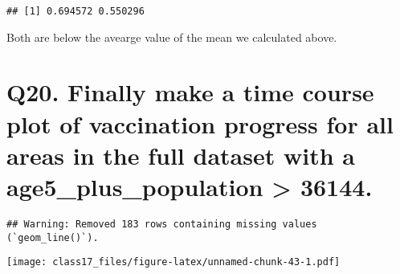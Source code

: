 \documentclass[
]{article}
\newenvironment{Shaded}{\begin{snugshade}}{\end{snugshade}}
\newcommand{\AttributeTok}[1]{\textcolor[rgb]{0.77,0.63,0.00}{#1}}
\newcommand{\DecValTok}[1]{\textcolor[rgb]{0.00,0.00,0.81}{#1}}
\newcommand{\FloatTok}[1]{\textcolor[rgb]{0.00,0.00,0.81}{#1}}
\newcommand{\FunctionTok}[1]{\textcolor[rgb]{0.00,0.00,0.00}{#1}}
\newcommand{\NormalTok}[1]{#1}
\newcommand{\OtherTok}[1]{\textcolor[rgb]{0.56,0.35,0.01}{#1}}
\newcommand{\SpecialCharTok}[1]{\textcolor[rgb]{0.00,0.00,0.00}{#1}}
\newcommand{\StringTok}[1]{\textcolor[rgb]{0.31,0.60,0.02}{#1}}
\begin{document}
\begin{verbatim}
## [1] 0.694572 0.550296
\end{verbatim}

Both are below the avearge value of the mean we calculated above.

\hypertarget{q20.-finally-make-a-time-course-plot-of-vaccination-progress-for-all-areas-in-the-full-dataset-with-a-age5_plus_population-36144.}{%
\section{Q20. Finally make a time course plot of vaccination progress
for all areas in the full dataset with a age5\_plus\_population
\textgreater{}
36144.}\label{q20.-finally-make-a-time-course-plot-of-vaccination-progress-for-all-areas-in-the-full-dataset-with-a-age5_plus_population-36144.}}

\begin{Shaded}
\end{Shaded}

\begin{verbatim}
## Warning: Removed 183 rows containing missing values (`geom_line()`).
\end{verbatim}

\texttt{[image: class17\_files/figure-latex/unnamed-chunk-43-1.pdf]}
\end{document}
